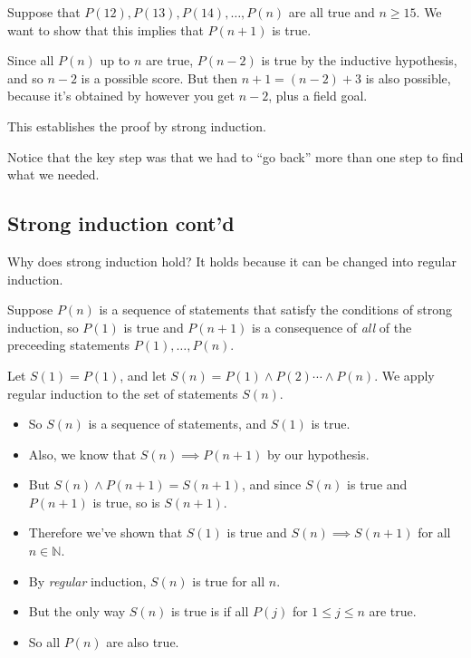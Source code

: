 \documentclass[
]{article}
\providecommand{\tightlist}{%
  \setlength{\itemsep}{0pt}\setlength{\parskip}{0pt}}
\begin{document}
Suppose that \(P(12), P(13), P(14),\ldots, P(n)\) are all true and
\(n\ge 15\). We want to show that this implies that \(P(n+1)\) is true.

Since all \(P(n)\) up to \(n\) are true, \(P(n-2)\) is true by the
inductive hypothesis, and so \(n-2\) is a possible score. But then
\(n+1=(n-2)+3\) is also possible, because it's obtained by however you
get \(n-2\), plus a field goal.

This establishes the proof by strong induction.

Notice that the key step was that we had to ``go back'' more than one
step to find what we needed.

\vfill\eject

\hypertarget{strong-induction-contd}{%
\subsection{Strong induction cont'd}\label{strong-induction-contd}}

Why does strong induction hold? It holds because it can be changed into
regular induction.

Suppose \(P(n)\) is a sequence of statements that satisfy the conditions
of strong induction, so \(P(1)\) is true and \(P(n+1)\) is a consequence
of \emph{all} of the preceeding statements \(P(1),\ldots,P(n)\).

Let \(S(1)=P(1)\), and let \(S(n)=P(1)\wedge P(2)\cdots\wedge P(n)\). We
apply regular induction to the set of statements \(S(n)\).

\begin{itemize}
\tightlist
\item
  So \(S(n)\) is a sequence of statements, and \(S(1)\) is true.\\
\item
  Also, we know that \(S(n)\implies P(n+1)\) by our hypothesis.\\
\item
  But \(S(n)\wedge P(n+1)=S(n+1)\), and since \(S(n)\) is true and
  \(P(n+1)\) is true, so is \(S(n+1)\).\\
\item
  Therefore we've shown that \(S(1)\) is true and
  \(S(n)\implies S(n+1)\) for all \(n\in\mathbb{N}\).\\
\item
  By \emph{regular} induction, \(S(n)\) is true for all \(n\).\\
\item
  But the only way \(S(n)\) is true is if all \(P(j)\) for
  \(1\le j\le n\) are true.\\
\item
  So all \(P(n)\) are also true.
\end{itemize}

\vfill\eject
\end{document}
